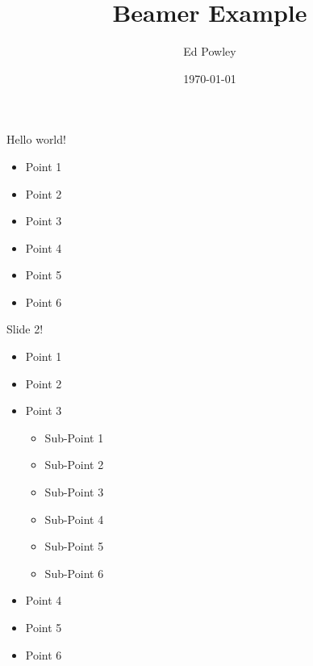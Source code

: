 \documentclass{beamer}
\title{Beamer Example}
\author{Ed Powley}
\date{\today}
\begin{document}
\maketitle

\begin{frame}{Hello world!}
	\begin{itemize}
		\item Point 1 \pause
		\item Point 2 \pause
		\item Point 3 \pause
		\item Point 4 \pause
		\item Point 5 \pause
		\item Point 6
	\end{itemize}
\end{frame}

\begin{frame}{Slide 2!}
	\begin{itemize}
		\item Point 1 \pause
		\item Point 2 \pause
		\item Point 3 \pause
			\begin{itemize}
				\item Sub-Point 1 
				\item Sub-Point 2 \pause
				\item Sub-Point 3 
				\item Sub-Point 4 \pause
				\item Sub-Point 5 
				\item Sub-Point 6 \pause
			\end{itemize}
		\item Point 4 \pause
		\item Point 5 \pause
		\item Point 6
	\end{itemize}
\end{frame}
\end{document}
